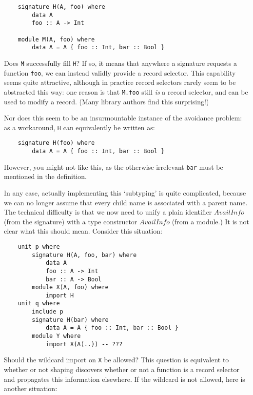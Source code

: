 \documentclass{article}
\newcommand{\I}[1]{\ensuremath{\mathit{#1}}}
\begin{document}
\begin{verbatim}
    signature H(A, foo) where
        data A
        foo :: A -> Int

    module M(A, foo) where
        data A = A { foo :: Int, bar :: Bool }
\end{verbatim}
%
Does \verb|M| successfully fill \verb|H|?  If so, it means that anywhere
a signature requests a function \verb|foo|, we can instead validly
provide a record selector.  This capability seems quite attractive,
although in practice record selectors rarely seem to be abstracted this
way: one reason is that \verb|M.foo| still \emph{is} a record selector,
and can be used to modify a record.  (Many library authors find this
surprising!)

Nor does this seem to be an insurmountable instance of the avoidance
problem:
as a workaround, \verb|H| can equivalently be written as:

\begin{verbatim}
    signature H(foo) where
        data A = A { foo :: Int, bar :: Bool }
\end{verbatim}
%
However, you might not like this, as the otherwise irrelevant \verb|bar| must be mentioned
in the definition.

In any case, actually implementing this `subtyping' is quite complicated, because we can no
longer assume that every child name is associated with a parent name.
The technical difficulty is that we now need to unify a plain identifier
\I{AvailInfo} (from the signature) with a type constructor \I{AvailInfo}
(from a module.)  It is not clear what this should mean.
Consider this situation:

\begin{verbatim}
    unit p where
        signature H(A, foo, bar) where
            data A
            foo :: A -> Int
            bar :: A -> Bool
        module X(A, foo) where
            import H
    unit q where
        include p
        signature H(bar) where
            data A = A { foo :: Int, bar :: Bool }
        module Y where
            import X(A(..)) -- ???
\end{verbatim}

Should the wildcard import on \verb|X| be allowed?
This question is equivalent to whether or not shaping discovers
whether or not a function is a record selector and propagates this
information elsewhere.
If the wildcard is not allowed, here is another situation:
\end{document}
